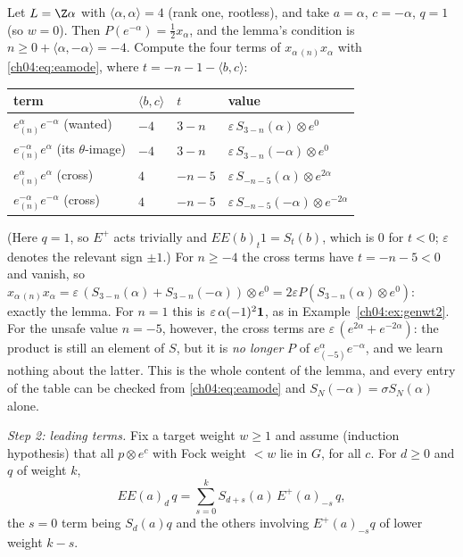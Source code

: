 \begin{example}\label{ch04:ex:saferank1}
Let $L=\Z\alpha$ with $\langle\alpha,\alpha\rangle=4$ (rank one, rootless), and take $a=\alpha$, $c=-\alpha$,
$q=1$ (so $w=0$). Then $P(e^{-\alpha})=\tfrac12x_\alpha$, and the lemma's condition is
$n\ge0+\langle\alpha,-\alpha\rangle=-4$. Compute the four terms of $x_{\alpha\,(n)}x_\alpha$ with
\eqref{ch04:eq:eamode}, where $t=-n-1-\langle b,c\rangle$:
\begin{center}
\begin{tabular}{llll}
\toprule
term & $\langle b,c\rangle$ & $t$ & value\\
\midrule
$e^{\alpha}_{(n)}e^{-\alpha}$ (wanted) & $-4$ & $3-n$ & $\varepsilon\,S_{3-n}(\alpha)\otimes e^0$\\
$e^{-\alpha}_{(n)}e^{\alpha}$ (its $\theta$-image) & $-4$ & $3-n$ & $\varepsilon\,S_{3-n}(-\alpha)\otimes e^0$\\
$e^{\alpha}_{(n)}e^{\alpha}$ (cross) & $4$ & $-n-5$ & $\varepsilon\,S_{-n-5}(\alpha)\otimes e^{2\alpha}$\\
$e^{-\alpha}_{(n)}e^{-\alpha}$ (cross) & $4$ & $-n-5$ & $\varepsilon\,S_{-n-5}(-\alpha)\otimes e^{-2\alpha}$\\
\bottomrule
\end{tabular}
\end{center}
(Here $q=1$, so $E^+$ acts trivially and $EE(b)_t1=S_t(b)$, which is $0$ for $t<0$; $\varepsilon$ denotes
the relevant sign $\pm1$.) For $n\ge-4$ the cross terms have $t=-n-5<0$ and vanish, so
$x_{\alpha\,(n)}x_\alpha=\varepsilon\,(S_{3-n}(\alpha)+S_{3-n}(-\alpha))\otimes e^0=2\varepsilon P(S_{3-n}(\alpha)\otimes e^0)$:
exactly the lemma. For $n=1$ this is $\varepsilon\,\alpha(-1)^2\mathbf{1}$, as in Example~\ref{ch04:ex:genwt2}.
For the unsafe value $n=-5$, however, the cross terms are $\varepsilon\,(e^{2\alpha}+e^{-2\alpha})$: the product
is still an element of $S$, but it is \emph{no longer} $P$ of $e^\alpha_{(-5)}e^{-\alpha}$, and we learn
nothing about the latter. This is the whole content of the lemma, and every entry of the table can
be checked from \eqref{ch04:eq:eamode} and $S_N(-\alpha)=\sigma S_N(\alpha)$ alone.
\end{example}

\emph{Step 2: leading terms.} Fix a target weight $w\ge1$ and assume (induction hypothesis) that
all $p\otimes e^c$ with Fock weight $<w$ lie in $G$, for all $c$. For $d\ge0$ and $q$ of weight $k$,
\begin{equation}\label{ch04:eq:EEexpand}
  EE(a)_d\,q=\sum_{s=0}^{k}S_{d+s}(a)\,E^+(a)_{-s}\,q ,
\end{equation}
the $s=0$ term being $S_d(a)q$ and the others involving $E^+(a)_{-s}q$ of lower weight $k-s$.

